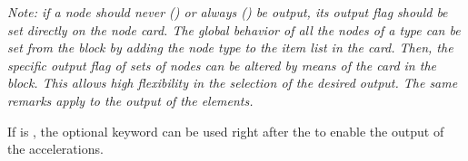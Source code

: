 \noindent
{\em
   Note: if a node should never () or always () be output,
   its output flag should be set directly on the node card. 
   The global behavior of all the nodes of a type can be set from the 
    block by adding the node type to the item list in the 
    card. 
   Then, the specific output flag of sets of nodes can be altered by means 
   of the  card in the  block. 
   This allows high flexibility in the selection of the desired output. 
   The same remarks apply to the output of the elements.
}

If  is , the optional keyword 
can be used right after the  to enable the output
of the accelerations.

